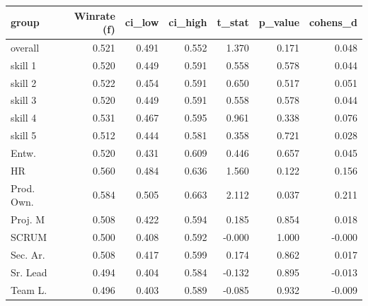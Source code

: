 \begin{tabular}{lrrrrrr}
\toprule
group & Winrate (f) & ci\_low & ci\_high & t\_stat & p\_value & cohens\_d \\
\midrule
overall & 0.521 & 0.491 & 0.552 & 1.370 & 0.171 & 0.048 \\
skill 1 & 0.520 & 0.449 & 0.591 & 0.558 & 0.578 & 0.044 \\
skill 2 & 0.522 & 0.454 & 0.591 & 0.650 & 0.517 & 0.051 \\
skill 3 & 0.520 & 0.449 & 0.591 & 0.558 & 0.578 & 0.044 \\
skill 4 & 0.531 & 0.467 & 0.595 & 0.961 & 0.338 & 0.076 \\
skill 5 & 0.512 & 0.444 & 0.581 & 0.358 & 0.721 & 0.028 \\
Entw. & 0.520 & 0.431 & 0.609 & 0.446 & 0.657 & 0.045 \\
HR & 0.560 & 0.484 & 0.636 & 1.560 & 0.122 & 0.156 \\
Prod. Own. & 0.584 & 0.505 & 0.663 & 2.112 & 0.037 & 0.211 \\
Proj. M & 0.508 & 0.422 & 0.594 & 0.185 & 0.854 & 0.018 \\
SCRUM & 0.500 & 0.408 & 0.592 & -0.000 & 1.000 & -0.000 \\
Sec. Ar. & 0.508 & 0.417 & 0.599 & 0.174 & 0.862 & 0.017 \\
Sr. Lead & 0.494 & 0.404 & 0.584 & -0.132 & 0.895 & -0.013 \\
Team L. & 0.496 & 0.403 & 0.589 & -0.085 & 0.932 & -0.009 \\
\bottomrule
\end{tabular}
